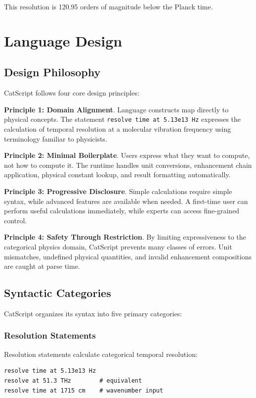 \documentclass[twocolumn,10pt]{article}
\begin{document}
This resolution is 120.95 orders of magnitude below the Planck time.

\section{Language Design}
\label{sec:design}

\subsection{Design Philosophy}

CatScript follows four core design principles:

\textbf{Principle 1: Domain Alignment}. Language constructs map directly to physical concepts. The statement \texttt{resolve time at 5.13e13 Hz} expresses the calculation of temporal resolution at a molecular vibration frequency using terminology familiar to physicists.

\textbf{Principle 2: Minimal Boilerplate}. Users express what they want to compute, not how to compute it. The runtime handles unit conversions, enhancement chain application, physical constant lookup, and result formatting automatically.

\textbf{Principle 3: Progressive Disclosure}. Simple calculations require simple syntax, while advanced features are available when needed. A first-time user can perform useful calculations immediately, while experts can access fine-grained control.

\textbf{Principle 4: Safety Through Restriction}. By limiting expressiveness to the categorical physics domain, CatScript prevents many classes of errors. Unit mismatches, undefined physical quantities, and invalid enhancement compositions are caught at parse time.

\subsection{Syntactic Categories}

CatScript organizes its syntax into five primary categories:

\subsubsection{Resolution Statements}

Resolution statements calculate categorical temporal resolution:
\begin{lstlisting}
resolve time at 5.13e13 Hz
resolve at 51.3 THz        # equivalent
resolve time at 1715 cm    # wavenumber input
\end{lstlisting}
\end{document}
